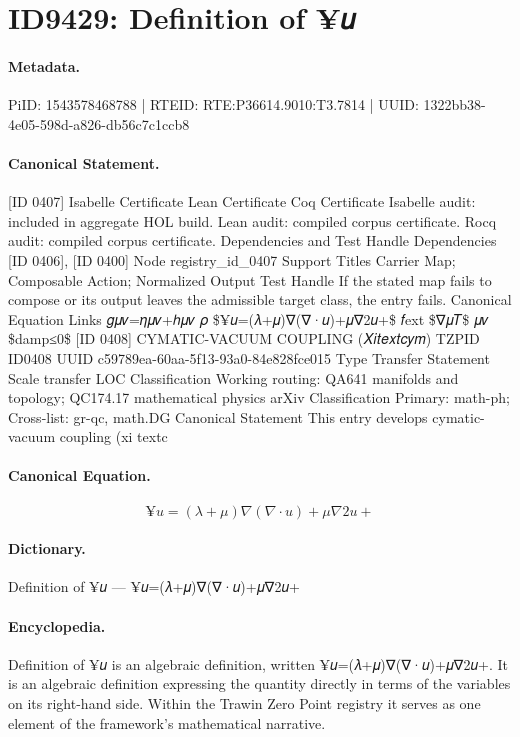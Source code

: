 \section*{ID9429: Definition of ¥𝑢}
\paragraph{Metadata.}
PiID: 1543578468788 | RTEID: RTE:P36614.9010:T3.7814 | UUID: 1322bb38-4e05-598d-a826-db56c7c1ccb8

\paragraph{Canonical Statement.}
[ID 0407] Isabelle Certificate Lean Certificate Coq Certificate Isabelle audit: included in aggregate HOL build. Lean audit: compiled corpus certificate. Rocq audit: compiled corpus certificate. Dependencies and Test Handle Dependencies [ID 0406], [ID 0400] Node registry\_id\_0407 Support Titles Carrier Map; Composable Action; Normalized Output Test Handle If the stated map fails to compose or its output leaves the admissible target class, the entry fails. Canonical Equation Links 𝑔𝜇𝜈=𝜂𝜇𝜈+ℎ𝜇𝜈 𝜌 \$¥𝑢=(𝜆+𝜇)∇(∇·𝑢)+𝜇∇2𝑢+\$ 𝑓ext \$∇𝜇𝑇\$ 𝜇𝜈 \$damp≤0\$ [ID 0408] CYMATIC-VACUUM COUPLING (𝑋𝑖𝑡𝑒𝑥𝑡𝑐𝑦𝑚) TZPID ID0408 UUID c59789ea-60aa-5f13-93a0-84e828fce015 Type Transfer Statement Scale transfer LOC Classification Working routing: QA641 manifolds and topology; QC174.17 mathematical physics arXiv Classification Primary: math-ph; Cross-list: gr-qc, math.DG Canonical Statement This entry develops cymatic-vacuum coupling (xi textc

\paragraph{Canonical Equation.}
\[
¥𝑢=(𝜆+𝜇)∇(∇·𝑢)+𝜇∇2𝑢+
\]

\paragraph{Dictionary.}
Definition of ¥𝑢 — ¥𝑢=(𝜆+𝜇)∇(∇·𝑢)+𝜇∇2𝑢+

\paragraph{Encyclopedia.}
Definition of ¥𝑢 is an algebraic definition, written ¥𝑢=(𝜆+𝜇)∇(∇·𝑢)+𝜇∇2𝑢+. It is an algebraic definition expressing the quantity directly in terms of the variables on its right-hand side. Within the Trawin Zero Point registry it serves as one element of the framework's mathematical narrative.
